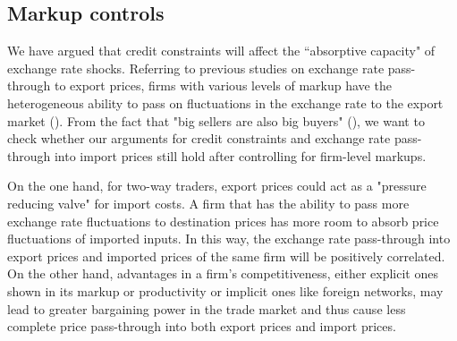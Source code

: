 \documentclass[12pt]{article}
\begin{document}
\subsection{Markup controls}

We have argued that credit constraints will affect the ``absorptive capacity" of exchange rate shocks. Referring to previous studies on exchange rate pass-through to export prices, firms with various levels of markup have the heterogeneous ability to pass on fluctuations in the exchange rate to the export market (\cite{aik2019}). From the fact that "big sellers are also big buyers" (\cite{aik2014}), we want to check whether our arguments for credit constraints and exchange rate pass-through into import prices still hold after controlling for firm-level markups.

On the one hand, for two-way traders, export prices could act as a "pressure reducing valve" for import costs. A firm that has the ability to pass more exchange rate fluctuations to destination prices has more room to absorb price fluctuations of imported inputs. In this way, the exchange rate pass-through into export prices and imported prices of the same firm will be positively correlated. On the other hand, advantages in a firm's competitiveness, either explicit ones shown in its markup or productivity or implicit ones like foreign networks, may lead to greater bargaining power in the trade market and thus cause less complete price pass-through into both export prices and import prices.
\end{document}
